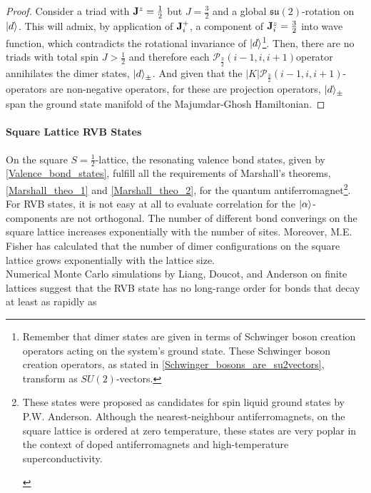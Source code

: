\begin{proof}
Consider a triad with ${\bf J}^z = \frac{1}{2}$ but $J = \frac{3}{2}$ and a global $\mathfrak{s}\mathfrak{u}(2)$-rotation on $\ket{d}$. This will admix, by application of ${\bf J}_i^+$, a component of ${\bf J}_i^z = \frac{3}{2}$ into wave function, which contradicts the rotational invariance of $\ket{d}$\footnote{Remember that dimer states are given in terms of Schwinger boson creation operators acting on the system's ground state. These Schwinger boson creation operators, as stated in \cref{Schwinger_bosons_are_su2vectors}, transform as $SU(2)$-vectors. }. Then, there are no triads with total spin $J > \frac{1}{2}$ and therefore each $\mathcal{P}_{\frac{3}{2}}(i-1,i,i+1)$operator annihilates the dimer states, $\ket{d}_{\pm}$. And given that the $|K|\mathcal{P}_{\frac{3}{2}}(i-1,i,i+1)$-operators are non-negative operators, for these are projection operators, $\ket{d}_{\pm}$ span the ground state manifold of the Majumdar-Ghosh Hamiltonian.

\end{proof}

\paragraph{Square Lattice RVB States}

On the square $S=\frac{1}{2}$-lattice, the resonating valence bond states, given by \cref{Valence_bond_states}, fulfill all the requirements of Marshall's theorems,  \cref{Marshall_theo_1} and \cref{Marshall_theo_2}, for the quantum antiferromagnet\footnote{\begin{tcolorbox}[colback=LimeGreen, title = Historical Context]

These states were proposed as candidates for spin liquid ground states by P.W. Anderson. Although the nearest-neighbour antiferromagnets, on the square lattice is ordered at zero temperature, these states are very poplar in the context of doped antiferromagnets and high-temperature superconductivity. 

\end{tcolorbox}}. For RVB states, it is not easy at all to evaluate correlation for the $\ket{\alpha}$-components are not orthogonal. The number of different bond converings on the square lattice increases exponentially with the number of sites. Moreover, M.E. Fisher has calculated that the number of dimer configurations on the square lattice grows exponentially with the lattice size. \\

Numerical Monte Carlo simulations by Liang, Doucot, and Anderson on finite lattices suggest that the RVB state has no long-range order for bonds that decay at least as rapidly as 

